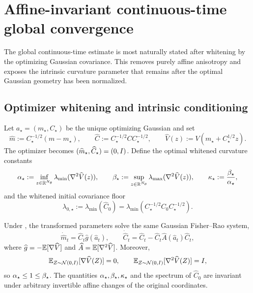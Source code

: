 \section{Affine-invariant continuous-time global convergence}
\label{sec:cont}

The global continuous-time estimate is most naturally stated after whitening by the optimizing
Gaussian covariance.  This removes purely affine anisotropy and exposes the intrinsic curvature
parameter that remains after the optimal Gaussian geometry has been normalized.

\subsection{Optimizer whitening and intrinsic conditioning}

Let $a_\star=(m_\star,C_\star)$ be the unique optimizing Gaussian and set
\begin{equation}
\label{eq:optimizer-whitening}
    \widehat m:=C_\star^{-1/2}(m-m_\star),
    \qquad
    \widehat C:=C_\star^{-1/2}CC_\star^{-1/2},
    \qquad
    \widehat V(z):=V(m_\star+C_\star^{1/2}z).
\end{equation}
The optimizer becomes $(\widehat m_\star,\widehat C_\star)=(0,I)$.  Define the optimal
whitened curvature constants
\begin{equation}
\label{eq:star-curvature}
    \alpha_\star
    :=\inf_{z\in\mathbb{R}^{N_\theta}}\lambda_{\min}(\nabla^2\widehat V(z)),
    \qquad
    \beta_\star
    :=\sup_{z\in\mathbb{R}^{N_\theta}}\lambda_{\max}(\nabla^2\widehat V(z)),
    \qquad
    \kappa_\star:=\frac{\beta_\star}{\alpha_\star},
\end{equation}
and the whitened initial covariance floor
\begin{equation}
\label{eq:lambda0-star}
    \lambda_{0,\star}
    :=\lambda_{\min}(\widehat C_0)
    =\lambda_{\min}(C_\star^{-1/2}C_0C_\star^{-1/2}).
\end{equation}

\begin{lemma}
\label{lem:optimizer-whitening}
Under , the transformed parameters solve the same Gaussian
Fisher--Rao system,
\begin{equation}
\label{eq:whitened-flow}
    \dot{\widehat m}_t=\widehat C_t\widehat g(\widehat a_t),
    \qquad
    \dot{\widehat C}_t
    =\widehat C_t-\widehat C_t\widehat A(\widehat a_t)\widehat C_t,
\end{equation}
where $\widehat g=-\mathbb{E}[\nabla\widehat V]$ and
$\widehat A=\mathbb{E}[\nabla^2\widehat V]$.  Moreover,
\[
    \mathbb{E}_{Z\sim\mathcal{N}(0,I)}[\nabla\widehat V(Z)]=0,
    \qquad
    \mathbb{E}_{Z\sim\mathcal{N}(0,I)}[\nabla^2\widehat V(Z)]=I,
\]
so $\alpha_\star\leq1\leq\beta_\star$.  The quantities $\alpha_\star,\beta_\star,\kappa_\star$ and the
spectrum of $\widehat C_0$ are invariant under arbitrary invertible affine changes of the original
coordinates.
\end{lemma}


